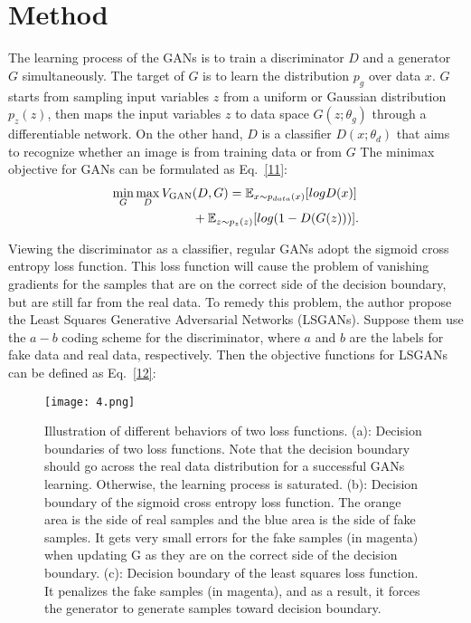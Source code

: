 \documentclass[10pt,twocolumn,letterpaper]{article}
\begin{document}
\section{Method}
The learning process of the GANs is to train a discriminator $D$ and a generator $G$ simultaneously. The target of $G$ is to learn the distribution $p_g$ over data $x$. $G$ starts from sampling input variables $z$ from a uniform or Gaussian distribution $p_z(z)$, then maps the input variables $z$ to data space $G(z;\theta_g)$ through a differentiable network. On the other hand, $D$ is a classifier $D(x;\theta_d)$ that aims to recognize whether an image is from training data or from $G$ The minimax objective for GANs can be formulated as Eq.~\ref{11}:
\begin{equation}\label{11}
\begin{split}
\mathop{{\rm min}}\limits_{G}\mathop{{\rm max}}\limits_{D}V_{{\rm GAN}}&(D,G)=\mathbb{E}_{x\sim p_{data}(x)}[logD(x)] \\
&+\mathbb{E}_{z\sim p_z(z)}[log(1-D(G(z)))].
\end{split}
\end{equation}
\par
Viewing the discriminator as a classifier, regular GANs adopt the sigmoid cross entropy loss function. This loss function
will cause the problem of vanishing gradients for the samples that are on the correct side of the decision boundary, but are still far from the real data. To remedy this problem, the author propose the Least Squares Generative Adversarial Networks
(LSGANs). Suppose them use the $a-b$ coding scheme for the discriminator, where $a$ and $b$ are the labels for fake data and real data, respectively. Then the objective functions for LSGANs can be defined as Eq.~\ref{12}:
\begin{figure*}
\begin{center}
  \texttt{[image: 4.png]}\\
  \caption{Illustration of different behaviors of two loss functions. (a): Decision boundaries of two loss functions. Note that the decision boundary should go across the real data distribution for a successful GANs learning. Otherwise, the learning process is saturated. (b): Decision boundary of the sigmoid cross entropy loss function. The orange area is the side of real samples and the blue area is the side of fake samples. It gets very small errors for the fake samples (in magenta) when updating G as they are on the correct side of the decision boundary. (c): Decision boundary of the least squares loss function. It penalizes the fake samples (in magenta), and as a result, it forces the generator to generate samples toward decision boundary.}\label{1}
\end{center}
\end{figure*}
\end{document}
